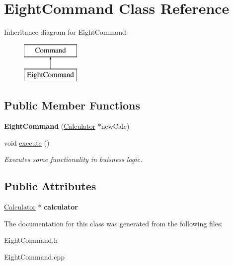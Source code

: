 \hypertarget{class_eight_command}{}\section{Eight\+Command Class Reference}
\label{class_eight_command}
Inheritance diagram for Eight\+Command\+:\begin{figure}[H]
\begin{center}
\leavevmode
\includegraphics[height=2.000000cm]{class_eight_command}
\end{center}
\end{figure}
\subsection*{Public Member Functions}
\begin{DoxyCompactItemize}
\item 
\hypertarget{class_eight_command_afe5d23069dc3e2baa96cf239e4164023}{}{\bfseries Eight\+Command} (\hyperlink{class_calculator}{Calculator} $\ast$new\+Calc)\label{class_eight_command_afe5d23069dc3e2baa96cf239e4164023}

\item 
\hypertarget{class_eight_command_afe2b90086e76b28a9adbcde328c1b2ce}{}void \hyperlink{class_eight_command_afe2b90086e76b28a9adbcde328c1b2ce}{execute} ()\label{class_eight_command_afe2b90086e76b28a9adbcde328c1b2ce}

\begin{DoxyCompactList}\small\item\em Executes some functionality in buisness logic. \end{DoxyCompactList}\end{DoxyCompactItemize}
\subsection*{Public Attributes}
\begin{DoxyCompactItemize}
\item 
\hypertarget{class_eight_command_aa4c2a48089ca694fc1122902fc5439c0}{}\hyperlink{class_calculator}{Calculator} $\ast$ {\bfseries calculator}\label{class_eight_command_aa4c2a48089ca694fc1122902fc5439c0}

\end{DoxyCompactItemize}


The documentation for this class was generated from the following files\+:\begin{DoxyCompactItemize}
\item 
Eight\+Command.\+h\item 
Eight\+Command.\+cpp\end{DoxyCompactItemize}
